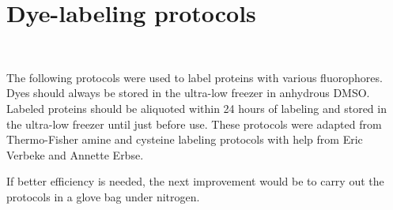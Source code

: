\chapter{Dye-labeling protocols}~\label{appx:dye-labeling}

The following protocols were used to label proteins with various fluorophores.  Dyes should always be stored in the ultra-low freezer in anhydrous DMSO.  Labeled proteins should be aliquoted within 24 hours of labeling and stored in the ultra-low freezer until just before use.  These protocols were adapted from Thermo-Fisher amine and cysteine labeling protocols with help from Eric Verbeke and Annette Erbse.

If better efficiency is needed, the next improvement would be to carry out the protocols in a glove bag under nitrogen.

